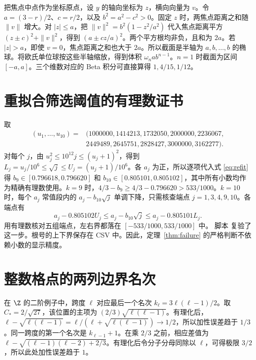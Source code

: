 \documentclass[11pt,a4paper,UTF8,fontset=fandol]{ctexart}
\theoremstyle{definition}
\begin{document}
把焦点中点作为坐标原点，设 \(y\) 的轴向坐标为 \(z\)，横向向量为 \(v\)。令 \(a=(3-r)/2\)、\(c=r/2\)，以及 \(b^2=a^2-c^2>0\)。固定 \(z\) 时，两焦点距离之和随 \(\|v\|\) 增大。对 \(|z|\le a\)，把 \(\|v\|^2=b^2(1-z^2/a^2)\) 代入焦点距离平方 \((z\pm c)^2+\|v\|^2\)，得到 \((a\pm cz/a)^2\)。两个平方根均非负，且和为 \(2a\)。若 \(|z|>a\)，即使 \(v=0\)，焦点距离之和也大于 \(2a\)。所以截面是半轴为 \(a,b,\ldots,b\) 的椭球。将欧氏单位球按这些半轴缩放，得到体积 \(\omega_n ab^{n-1}\)。\(n=1\) 时截面为区间 \([-a,a]\)。三个维数对应的 Beta 积分可直接算得 \(1,4/15,1/12\)。

\section{重拟合筛选阈值的有理数证书}\label{app:certificate}

取
\[
\begin{aligned}
(u_1,\ldots,u_{10})={}&(1000000,1414213,1732050,2000000,2236067,\\
&2449489,2645751,2828427,3000000,3162277).
\end{aligned}
\]
对每个 \(j\)，由 \(u_j^2\le10^{12}j\le(u_j+1)^2\)，得到 \(L_j=u_j/10^6\le\sqrt j\le U_j=(u_j+1)/10^6\)。各 \(a_j\) 为正，所以逐项代入式 \eqref{eq:refit} 得 \(b_9\in[0.796618,0.796620]\) 和 \(b_{10}\in[0.805101,0.805102]\)，其中所有小数均作为精确有理数使用。\(k=9\) 时，\(4/3-b_9\ge4/3-0.796620>533/1000\)。\(k=10\) 时，每个 \(a_j\) 常值段内的 \(a_j-b_{10}\sqrt j\) 单调下降，只需核查端点 \(j=1,3,4,9,10\)。各端点有
\[
a_j-0.805102 U_j\le a_j-b_{10}\sqrt j\le a_j-0.805101 L_j.
\]
用有理数核对五组端点，左右界都落在 \([-533/1000,533/1000]\) 中。
脚本  复验了这一步。根号的上下界保存在 CSV 中。因此，定理~\ref{thm:failure} 的严格判断不依赖小数的显示精度。

\section{整数格点的两列边界名次}\label{app:line}

在 \(\Z\) 的二阶例子中，跨度 \(\ell\) 对应最后一个名次 \(k_\ell=3\ell(\ell-1)/2\)。取 \(C_*=2/\sqrt{27}\)，该位置的主项为 \((2/3)\sqrt{\ell(\ell-1)}\)。有理化后，\(\ell-\sqrt{\ell(\ell-1)}=\ell/(\ell+\sqrt{\ell(\ell-1)})\to1/2\)，所以加性误差趋于 \(1/3\)。同一跨度的第一个名次是 \(k_{\ell-1}+1\)。在乘 \(2/3\) 之前，相应差值为 \(\ell-\sqrt{(\ell-1)(\ell-2)+2/3}\)。有理化后令分子分母同除以 \(\ell\)，可得极限 \(3/2\)，所以此处加性误差趋于 \(1\)。



\end{document}
